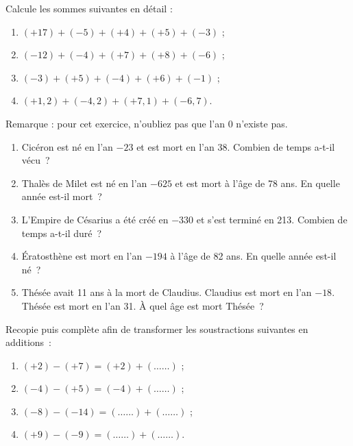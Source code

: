 \begin{exercice}
Calcule les sommes suivantes en détail :
\begin{enumerate}
 \item $(+17) + (-5) + (+4) + (+5) + (-3)$ ;
 \item $(-12) + (-4) + (+7) + (+8) + (-6)$ ;
 \item $(-3) + (+5) + (-4) + (+6) + (-1)$ ;
 \item $(+1,2) + (-4,2) + (+7,1) + (-6,7)$.
 \end{enumerate}
\end{exercice}


\begin{exercice}
Remarque : pour cet exercice, n'oubliez pas que l'an 0 n'existe pas.
\begin{enumerate}
 \item Cicéron est né en l'an $-23$ et est mort en l'an 38. Combien de temps a-t-il vécu ?
 \item Thalès de Milet est né en l'an $-625$ et est mort à l'âge de 78 ans. En quelle année est-il mort ?
 \item L'Empire de Césarius a été créé en $-330$ et s'est terminé en 213. Combien de temps a-t-il duré ?
 \item Ératosthène est mort en l'an $-194$ à l'âge de 82 ans. En quelle année est-il né ?
 \item Thésée avait 11 ans à la mort de Claudius. Claudius est mort en l'an $-18$. Thésée est mort en l'an 31. À quel âge est mort Thésée ?
 \end{enumerate}
\end{exercice}




\begin{exercice}
Recopie puis complète afin de transformer les soustractions suivantes en additions :
\begin{enumerate}
 \item $(+2) - (+7) = (+2) + (\ldots \ldots)$ ;
 \item $(-4) - (+5) = (-4) + (\ldots \ldots)$ ;
 \item $(-8) - (-14) =  (\ldots \ldots) + (\ldots \ldots)$ ;
 \item $(+9) - (-9) =  (\ldots \ldots) + (\ldots \ldots)$.
 \end{enumerate}
\end{exercice}


